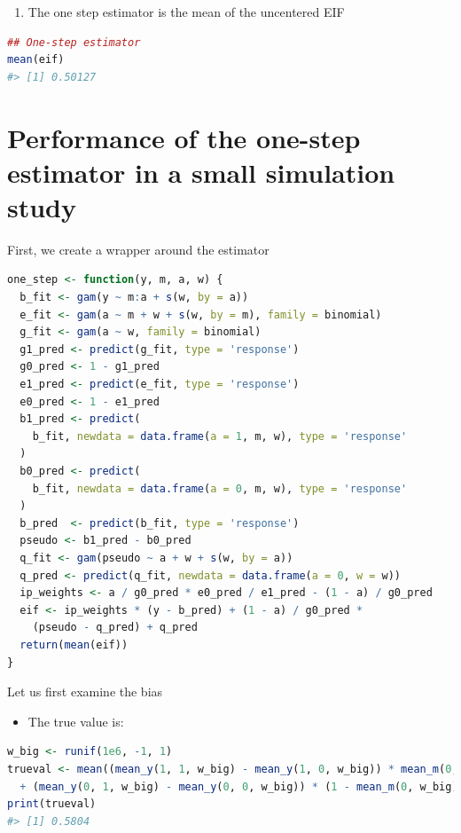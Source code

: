 \documentclass[
  12pt,
]{book}
\providecommand{\tightlist}{%
  \setlength{\itemsep}{0pt}\setlength{\parskip}{0pt}}
\theoremstyle{definition}
\theoremstyle{definition}
\theoremstyle{definition}
\newcommand{\1}{\mathbbm{1}}
\begin{document}
\begin{enumerate}
\def\labelenumi{\arabic{enumi}.}
\setcounter{enumi}{5}
\tightlist
\item
  The one step estimator is the mean of the uncentered EIF
\end{enumerate}

\begin{lstlisting}[language=R]
## One-step estimator
mean(eif)
#> [1] 0.50127
\end{lstlisting}

\hypertarget{performance-of-the-one-step-estimator-in-a-small-simulation-study}{%
\section{Performance of the one-step estimator in a small simulation study}\label{performance-of-the-one-step-estimator-in-a-small-simulation-study}}

First, we create a wrapper around the estimator

\begin{lstlisting}[language=R]
one_step <- function(y, m, a, w) {
  b_fit <- gam(y ~ m:a + s(w, by = a))
  e_fit <- gam(a ~ m + w + s(w, by = m), family = binomial)
  g_fit <- gam(a ~ w, family = binomial)
  g1_pred <- predict(g_fit, type = 'response')
  g0_pred <- 1 - g1_pred
  e1_pred <- predict(e_fit, type = 'response')
  e0_pred <- 1 - e1_pred
  b1_pred <- predict(
    b_fit, newdata = data.frame(a = 1, m, w), type = 'response'
  )
  b0_pred <- predict(
    b_fit, newdata = data.frame(a = 0, m, w), type = 'response'
  )
  b_pred  <- predict(b_fit, type = 'response')
  pseudo <- b1_pred - b0_pred
  q_fit <- gam(pseudo ~ a + w + s(w, by = a))
  q_pred <- predict(q_fit, newdata = data.frame(a = 0, w = w))
  ip_weights <- a / g0_pred * e0_pred / e1_pred - (1 - a) / g0_pred
  eif <- ip_weights * (y - b_pred) + (1 - a) / g0_pred *
    (pseudo - q_pred) + q_pred
  return(mean(eif))
}
\end{lstlisting}

Let us first examine the bias

\begin{itemize}
\tightlist
\item
  The true value is:
\end{itemize}

\begin{lstlisting}[language=R]
w_big <- runif(1e6, -1, 1)
trueval <- mean((mean_y(1, 1, w_big) - mean_y(1, 0, w_big)) * mean_m(0, w_big)
  + (mean_y(0, 1, w_big) - mean_y(0, 0, w_big)) * (1 - mean_m(0, w_big)))
print(trueval)
#> [1] 0.5804
\end{lstlisting}
\end{document}
